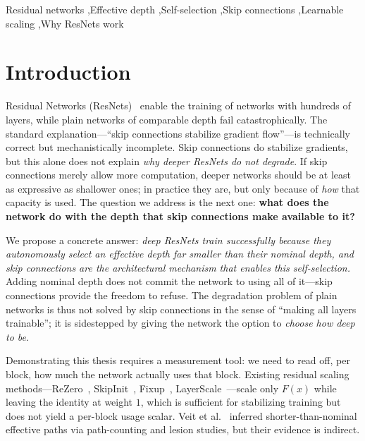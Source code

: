 \documentclass[preprint,12pt]{elsarticle}
\begin{document}
\begin{frontmatter}
\begin{abstract}
This reframes a long-standing puzzle. The degradation problem is not a failure to be solved---it is the network correctly refusing to use redundant depth. Skip connections do not just stabilize gradients; they provide the architectural freedom for the network to choose its own depth, and that choice is what makes deep ResNets train successfully.
\end{abstract}

\begin{keyword}
Residual networks \sep Effective depth \sep Self-selection \sep Skip connections \sep Learnable scaling \sep Why ResNets work
\end{keyword}

\end{frontmatter}

\section{Introduction}
\label{sec:intro}

Residual Networks (ResNets)~\cite{he2016deep} enable the training of networks with hundreds of layers, while plain networks of comparable depth fail catastrophically. The standard explanation---``skip connections stabilize gradient flow''---is technically correct but mechanistically incomplete. Skip connections do stabilize gradients, but this alone does not explain \emph{why deeper ResNets do not degrade}. If skip connections merely allow more computation, deeper networks should be at least as expressive as shallower ones; in practice they are, but only because of \emph{how} that capacity is used. The question we address is the next one: \textbf{what does the network do with the depth that skip connections make available to it?}

We propose a concrete answer: \emph{deep ResNets train successfully because they autonomously select an effective depth far smaller than their nominal depth, and skip connections are the architectural mechanism that enables this self-selection.} Adding nominal depth does not commit the network to using all of it---skip connections provide the freedom to refuse. The degradation problem of plain networks is thus not solved by skip connections in the sense of ``making all layers trainable''; it is sidestepped by giving the network the option to \emph{choose how deep to be}.

Demonstrating this thesis requires a measurement tool: we need to read off, per block, how much the network actually uses that block. Existing residual scaling methods---ReZero~\cite{bachlechner2021rezero}, SkipInit~\cite{de2020batch}, Fixup~\cite{zhang2019fixup}, LayerScale~\cite{touvron2021going}---scale only $F(x)$ while leaving the identity at weight $1$, which is sufficient for stabilizing training but does not yield a per-block usage scalar. Veit et al.~\cite{veit2016residual} inferred shorter-than-nominal effective paths via path-counting and lesion studies, but their evidence is indirect.
\end{document}
